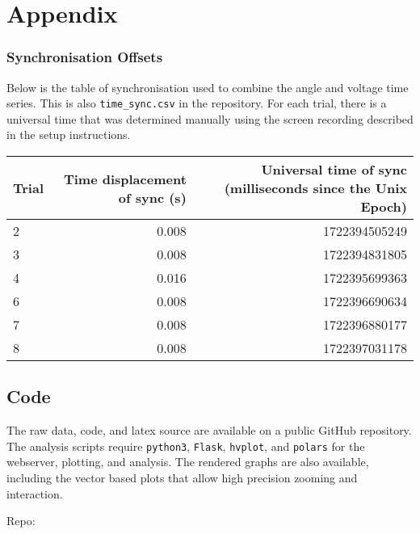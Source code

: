 \section*{Appendix}


\begin{table}
\subsubsection*{Synchronisation Offsets}
Below is the table of synchronisation used to combine the angle and voltage time series. This is also \verb|time_sync.csv| in the repository.
For each trial, there is a universal time that was determined manually using the screen recording described in the setup instructions.
\label{tab:SynchronisationTable}
\begin{center}
\begin{tabular}{|lrr|}

\hline
Trial & Time displacement of sync (s) & Universal time of sync (milliseconds since the Unix Epoch) \\
\hline
2 & 0.008 & 1722394505249 \\
3 & 0.008 & 1722394831805 \\
4 & 0.016 & 1722395699363 \\
6 & 0.008 & 1722396690634 \\
7 & 0.008 & 1722396880177 \\
8 & 0.008 & 1722397031178 \\
\hline
\end{tabular}

\end{center}
\end{table}

\subsection*{Code}

The raw data, code, and latex source are available on a public GitHub repository.
The analysis scripts require \verb|python3|, \verb|Flask|, \verb|hvplot|, and \verb|polars| for the webserver, plotting, and analysis.
The rendered graphs are also available, including the vector based plots that allow high precision zooming and interaction.

Repo: \href{https://github*.com/TunaMaestro/phys1241_final_lab.git}{}

